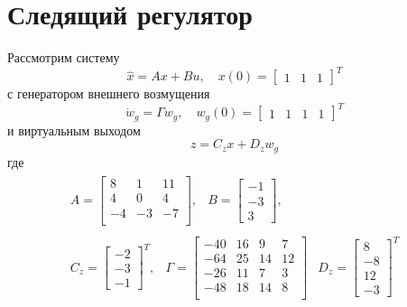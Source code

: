 \section{Следящий регулятор}
Рассмотрим систему 
\begin{equation}
    \hat{x} = Ax + Bu, \quad x(0) = \begin{bmatrix}1 & 1 & 1\end{bmatrix}^T
\end{equation}
с генератором внешнего возмущения 
\begin{equation}
    \dot{w}_g = \Gamma w_g, \quad w_g(0) = \begin{bmatrix}1 & 1 & 1 & 1\end{bmatrix}^T
\end{equation}
и виртуальным выходом
\begin{equation}
    z = C_z x + D_z w_g 
\end{equation}
где 
\begin{equation}
    \begin{array}{cc}
        \begin{array}{cc}
            A = \begin{bmatrix}
                8 & 1 & 11 \\ 
                4 & 0 & 4 \\ 
                -4 & -3 & -7 \\ 
            \end{bmatrix}, & 
            B = \begin{bmatrix} -1 \\ -3 \\ 3 \end{bmatrix},
        \end{array} \\ 
        \begin{array}{ccc}
        C_z = \begin{bmatrix} -2 \\ -3 \\ -1 \end{bmatrix}^T, & 
        \Gamma = \begin{bmatrix}
            -40 & 16 & 9 & 7 \\ 
            -64 & 25 & 14 & 12 \\
            -26 & 11 & 7 & 3 \\ 
            -48 & 18 & 14 & 8 \\ 
        \end{bmatrix} & 
        D_z = \begin{bmatrix}8 \\ -8 \\ 12 \\ -3\end{bmatrix}^T
        \end{array}
    \end{array}
\end{equation}

